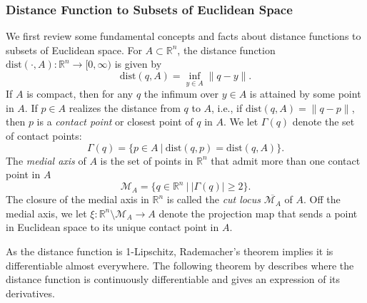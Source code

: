 \documentclass[11pt]{article}
\newcommand{\R}{\mathbb{R}}
\newcommand{\dist}{\mathrm{dist}}
\theoremstyle{plain}
\theoremstyle{definition}
\theoremstyle{remark}
\begin{document}
	\subsubsection{Distance Function to Subsets of Euclidean Space}
	\label{sec:Euclidean_distance_functions}
	We first review some fundamental concepts and facts about distance functions to subsets of Euclidean space. For $A \subset \R^n$, the distance function $\dist(\cdot, A): \R^n \to [0, \infty)$ is given by
	\begin{equation}
		\dist(q, A) = \inf_{y \in A} \| q - y \|.
	\end{equation}
	If $A$ is compact, then for any $q$ the infimum over $y \in A$ is attained by some point in $A$. If $p \in A$ realizes the distance from $q$ to $A$, i.e., if $\dist(q, A) = \| q - p \|$, then $p$ is a \textit{contact point} or closest point of $q$ in $A$. We let $\Gamma(q)$ denote the set
	of contact points:
	\[\Gamma(q) = \{ p \in A ~|~ \dist(q,p) = \dist(q,A) \}.\]
	The \emph{medial axis} of $A$ is the set of points in $\R^n$ that admit more than one contact point in $A$ \citep{federer1959curvature}
	\[\mathcal{M}_{A} = \{ q \in \R^n ~|~ |\Gamma(q)| \geq 2 \}.\]
	The closure of the medial axis in $\R^n$ is called the \textit{cut locus} $\overline{\mathcal{M}_{A}}$ of $A$. Off the medial axis, we let $\xi: \R^n \setminus \mathcal{M}_{A} \to A$ denote the projection map that sends a point in Euclidean space to its unique contact point in $A$.
	
	As the distance function is 1-Lipschitz, Rademacher's theorem implies it is differentiable almost everywhere. The following theorem by \cite{federer1959curvature} describes where the distance function is continuously differentiable and gives an expression of its derivatives.  
	
\end{document}

